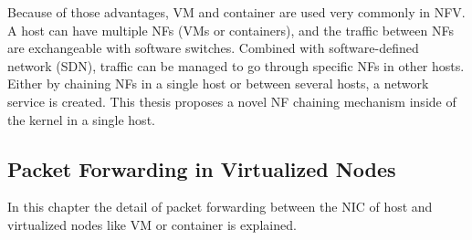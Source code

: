 Because of those advantages, VM and container are used very commonly in NFV. A host can have multiple NFs (VMs or containers), and the traffic between NFs are exchangeable with software switches. Combined with software-defined network (SDN), traffic can be managed to go through specific NFs in other hosts. Either by chaining NFs in a single host or between several hosts, a network service is created. This thesis proposes a novel NF chaining mechanism inside of the kernel in a single host. 

\subsection{Packet Forwarding in Virtualized Nodes}
In this chapter the detail of packet forwarding between the NIC of host and virtualized nodes like VM or container is explained. 

